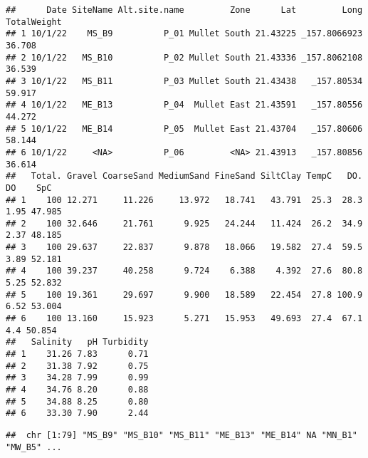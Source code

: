 \documentclass[
]{article}
\newenvironment{Shaded}{\begin{snugshade}}{\end{snugshade}}
\newcommand{\CommentTok}[1]{\textcolor[rgb]{0.56,0.35,0.01}{\textit{#1}}}
\newcommand{\FunctionTok}[1]{\textcolor[rgb]{0.13,0.29,0.53}{\textbf{#1}}}
\newcommand{\NormalTok}[1]{#1}
\newcommand{\SpecialCharTok}[1]{\textcolor[rgb]{0.81,0.36,0.00}{\textbf{#1}}}
\begin{document}
\begin{verbatim}
##      Date SiteName Alt.site.name         Zone      Lat         Long TotalWeight
## 1 10/1/22    MS_B9          P_01 Mullet South 21.43225 _157.8066923      36.708
## 2 10/1/22   MS_B10          P_02 Mullet South 21.43336 _157.8062108      36.539
## 3 10/1/22   MS_B11          P_03 Mullet South 21.43438   _157.80534      59.917
## 4 10/1/22   ME_B13          P_04  Mullet East 21.43591   _157.80556      44.272
## 5 10/1/22   ME_B14          P_05  Mullet East 21.43704   _157.80606      58.144
## 6 10/1/22     <NA>          P_06         <NA> 21.43913   _157.80856      36.614
##   Total. Gravel CoarseSand MediumSand FineSand SiltClay TempC   DO.   DO    SpC
## 1    100 12.271     11.226     13.972   18.741   43.791  25.3  28.3 1.95 47.985
## 2    100 32.646     21.761      9.925   24.244   11.424  26.2  34.9 2.37 48.185
## 3    100 29.637     22.837      9.878   18.066   19.582  27.4  59.5 3.89 52.181
## 4    100 39.237     40.258      9.724    6.388    4.392  27.6  80.8 5.25 52.832
## 5    100 19.361     29.697      9.900   18.589   22.454  27.8 100.9 6.52 53.004
## 6    100 13.160     15.923      5.271   15.953   49.693  27.4  67.1  4.4 50.854
##   Salinity   pH Turbidity
## 1    31.26 7.83      0.71
## 2    31.38 7.92      0.75
## 3    34.28 7.99      0.99
## 4    34.76 8.20      0.88
## 5    34.88 8.25      0.80
## 6    33.30 7.90      2.44
\end{verbatim}

\begin{Shaded}
\end{Shaded}

\begin{verbatim}
##  chr [1:79] "MS_B9" "MS_B10" "MS_B11" "ME_B13" "ME_B14" NA "MN_B1" "MW_B5" ...
\end{verbatim}

\begin{Shaded}
\end{Shaded}
\end{document}
